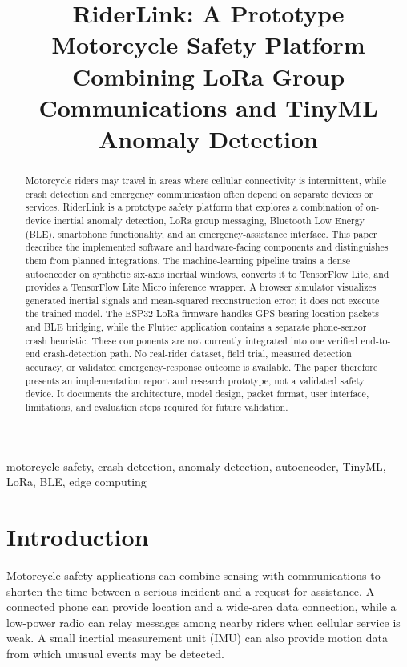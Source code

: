 \documentclass[conference]{IEEEtran}
\title{RiderLink: A Prototype Motorcycle Safety Platform Combining LoRa Group Communications and TinyML Anomaly Detection}
\author{\IEEEauthorblockN{Ashwin K. P.}
\IEEEauthorblockA{Independent Project}}
\begin{document}
\maketitle

\begin{abstract}
Motorcycle riders may travel in areas where cellular connectivity is intermittent, while crash detection and emergency communication often depend on separate devices or services. RiderLink is a prototype safety platform that explores a combination of on-device inertial anomaly detection, LoRa group messaging, Bluetooth Low Energy (BLE), smartphone functionality, and an emergency-assistance interface. This paper describes the implemented software and hardware-facing components and distinguishes them from planned integrations. The machine-learning pipeline trains a dense autoencoder on synthetic six-axis inertial windows, converts it to TensorFlow Lite, and provides a TensorFlow Lite Micro inference wrapper. A browser simulator visualizes generated inertial signals and mean-squared reconstruction error; it does not execute the trained model. The ESP32 LoRa firmware handles GPS-bearing location packets and BLE bridging, while the Flutter application contains a separate phone-sensor crash heuristic. These components are not currently integrated into one verified end-to-end crash-detection path. No real-rider dataset, field trial, measured detection accuracy, or validated emergency-response outcome is available. The paper therefore presents an implementation report and research prototype, not a validated safety device. It documents the architecture, model design, packet format, user interface, limitations, and evaluation steps required for future validation.
\end{abstract}

\begin{IEEEkeywords}
motorcycle safety, crash detection, anomaly detection, autoencoder, TinyML, LoRa, BLE, edge computing
\end{IEEEkeywords}

\section{Introduction}
Motorcycle safety applications can combine sensing with communications to shorten the time between a serious incident and a request for assistance. A connected phone can provide location and a wide-area data connection, while a low-power radio can relay messages among nearby riders when cellular service is weak. A small inertial measurement unit (IMU) can also provide motion data from which unusual events may be detected.
\end{document}
